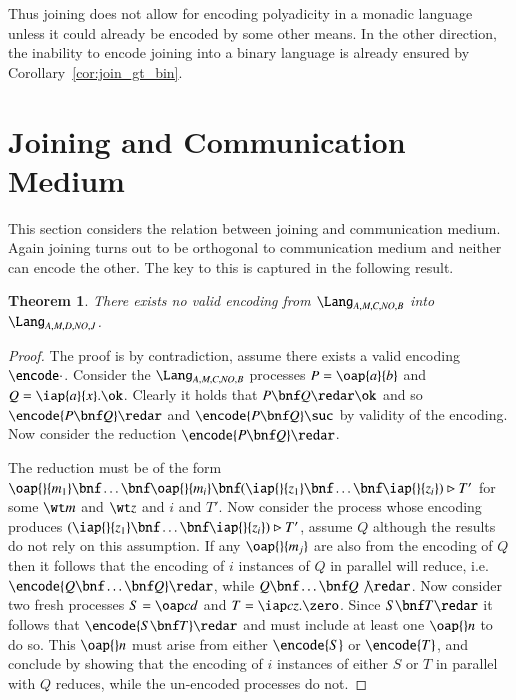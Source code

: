\documentclass[submission,copyright,creativecommons]{eptcs}
\newtheorem{theorem}{Theorem}[section]
\newcommand{\join}[1]{(#1)\rhd }
\begin{document}
Thus joining does not allow for encoding polyadicity in a monadic language unless it could already be
encoded by some other means.
In the other direction, the inability to encode joining into a binary language is already 
ensured by Corollary~\ref{cor:join_gt_bin}.


\section{Joining and Communication Medium}
\label{sec:join_comm}

This section considers the relation between joining and communication medium. Again joining turns out
to be orthogonal to communication medium and neither can encode the other.
The key to this is captured in the following result.


\begin{theorem}
\label{thm:no_chan_2_join}
There exists no valid encoding from $\Lang_{A,M,C,\mathit{NO},B}$ into $\Lang_{A,M,D,\mathit{NO},J}$.
\end{theorem}
\begin{proof}
The proof is by contradiction, assume there exists a valid encoding $\encode\cdot$.
Consider the $\Lang_{A,M,C,\mathit{NO},B}$ processes $P=\oap {a} {b}$ and $Q=\iap {a} {x} .\ok$.
Clearly it holds that $P\bnf Q\redar\ok$ and so $\encode{P\bnf Q}\redar$ and $\encode{P\bnf Q}\suc$
by validity of the encoding. Now consider the reduction $\encode{P\bnf Q}\redar$.

The reduction must be of the form
$\oap {} {m_1} \bnf \ldots \bnf \oap {} {m_i} \bnf \join {\iap {} {z_1}\bnf\ldots\bnf\iap {} {z_i}} T'$
for some $\wt m$ and $\wt z$ and $i$ and $T'$.
Now consider the process whose encoding produces $\join {\iap {} {z_1}\bnf\ldots\bnf\iap {} {z_i}} T'$,
assume $Q$ although the results do not rely on this assumption.
If any $\oap {} {m_j}$ are also from the encoding of $Q$ then it follows that the encoding of
$i$ instances of $Q$ in parallel will reduce, i.e.~$\encode{Q\bnf \ldots\bnf Q}\redar$, while
$Q\bnf \ldots \bnf Q\not\redar$.
Now consider two fresh processes $S=\oap c d$ and $T=\iap c z.\zero$.
Since $S\bnf T\redar$ it follows that $\encode{S\bnf T}\redar$ and must include at least one
$\oap {} n$ to do so.
This $\oap {} n$ must arise from either $\encode{S}$ or $\encode {T}$, and conclude by showing that
the encoding of $i$ instances of either $S$ or $T$ in parallel with $Q$ reduces, while the
un-encoded processes do not.
\end{proof}
\end{document}
